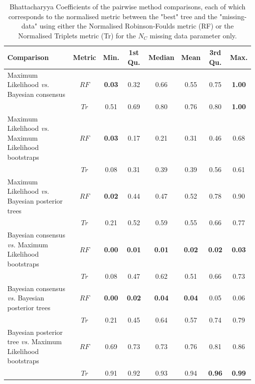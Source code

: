 \begin{landscape}
\begin{table}[!htb]
\caption[Bhattacharyya Coefficients of the pairwise method comparisons ($N_{C}$).]{Bhattacharyya Coefficients of the pairwise method comparisons, each of which corresponds to the normalised metric between the "best" tree and the "missing-data" using either the Normalised Robinson-Foulds metric (RF) or the Normalised Triplets metric (Tr) for the $N_{C}$ missing data parameter only.}
\label{Tab_Supp_summary_BC_MC}
\centering
\begin{tabular}{lccccccc}
  \hline
 Comparison &  Metric & Min. & 1st Qu. & Median & Mean & 3rd Qu. & Max. \\  
  \hline
    Maximum Likelihood \textit{vs.} Bayesian consensus                 & $RF$ & \textbf{0.03} & 0.32 & 0.66 & 0.55 & 0.75 & \textbf{1.00} \\ 
                                                                       & $Tr$ & 0.51 & 0.69 & 0.80 & 0.76 & 0.80 & \textbf{1.00} \\ 
    Maximum Likelihood \textit{vs.} Maximum Likelihood bootstraps      & $RF$ & \textbf{0.03} & 0.17 & 0.21 & 0.31 & 0.46 & 0.68 \\ 
                                                                       & $Tr$ & 0.08 & 0.31 & 0.39 & 0.39 & 0.56 & 0.61 \\ 
    Maximum Likelihood \textit{vs.} Bayesian posterior trees           & $RF$ & \textbf{0.02} & 0.44 & 0.47 & 0.52 & 0.78 & 0.90 \\ 
                                                                       & $Tr$ & 0.21 & 0.52 & 0.59 & 0.55 & 0.66 & 0.77 \\ 
    Bayesian consensus \textit{vs.} Maximum Likelihood bootstraps      & $RF$ & \textbf{0.00} & \textbf{0.01} & \textbf{0.01} & \textbf{0.02} & \textbf{0.02} & \textbf{0.03} \\ 
                                                                       & $Tr$ & 0.08 & 0.47 & 0.62 & 0.51 & 0.66 & 0.73 \\ 
    Bayesian consensus \textit{vs.} Bayesian posterior trees           & $RF$ & \textbf{0.00} & \textbf{0.02} & \textbf{0.04} & \textbf{0.04} & 0.05 & 0.06 \\ 
                                                                       & $Tr$ & 0.21 & 0.45 & 0.64 & 0.57 & 0.74 & 0.79 \\ 
    Bayesian posterior tree \textit{vs.} Maximum Likelihood bootstraps & $RF$ & 0.69 & 0.73 & 0.73 & 0.76 & 0.81 & 0.86 \\ 
                                                                       & $Tr$ & 0.91 & 0.92 & 0.93 & 0.94 & \textbf{0.96} & \textbf{0.99} \\ 
   \hline
\end{tabular}
\end{table}
\end{landscape}

